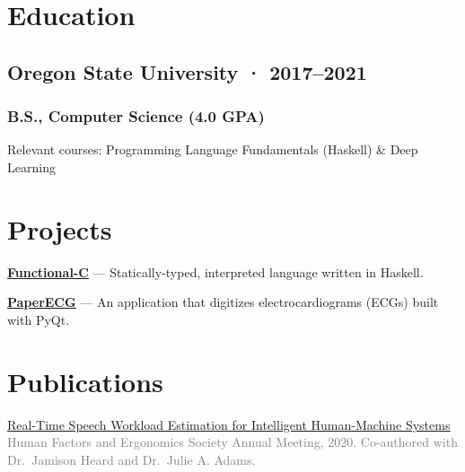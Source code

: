 \documentclass[12pt]{article} %
\let\defaultref\href
\renewcommand{\href}[2]{%
  \defaultref{#1}{\ul{#2}}%
}
\renewcommand{\emph}[1]{%
  \textcolor{gray}{#1}%
}
\begin{document}
\begin{paracol}{2}
\setlength{\columnsep}{1em}

\hypertarget{education}{%
\section{Education}\label{education}}

\hypertarget{oregon-state-university-20172021}{%
\subsection{Oregon State University ·
2017--2021}\label{oregon-state-university-20172021}}

\vspace{-5pt}

\hypertarget{b.s.-computer-science-4.0-gpa}{%
\subsubsection{B.S., Computer Science (4.0
GPA)}\label{b.s.-computer-science-4.0-gpa}}

Relevant courses: Programming Language Fundamentals (Haskell) \& Deep
Learning

\switchcolumn

\hypertarget{projects}{%
\section{Projects}\label{projects}}

\textbf{\href{https://github.com/julianfortune/CS381Project}{Functional-C}}
--- Statically-typed, interpreted language written in Haskell.

\textbf{\href{https://github.com/Tereshchenkolab/paper-ecg}{PaperECG}}
--- An application that digitizes electrocardiograms (ECGs) built with
PyQt.

\end{paracol}

\hypertarget{publications}{%
\section{Publications}\label{publications}}

\vspace{1pt}

\href{https://doi.org/10.1177/1071181320641076}{Real-Time Speech
Workload Estimation for Intelligent Human-Machine Systems}\\
\emph{Human Factors and Ergonomics Society Annual Meeting, 2020.
Co-authored with Dr.~Jamison Heard and Dr.~Julie A. Adams.}
\end{document}
